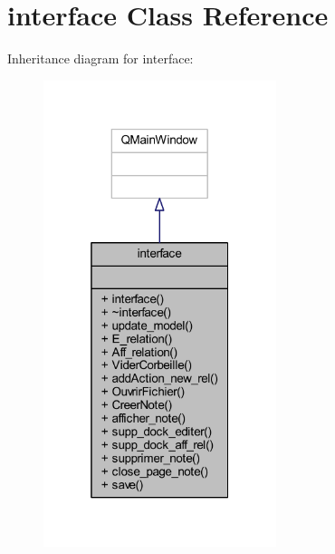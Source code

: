 \hypertarget{classinterface}{}\section{interface Class Reference}
\label{classinterface}


Inheritance diagram for interface\+:
\nopagebreak
\begin{figure}[H]
\begin{center}
\leavevmode
\includegraphics[width=193pt]{classinterface__inherit__graph}
\end{center}
\end{figure}


